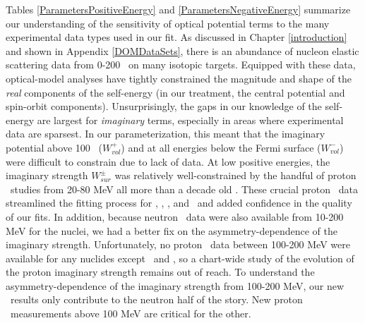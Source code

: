 Tables \ref{ParametersPositiveEnergy} and \ref{ParametersNegativeEnergy}
summarize our understanding of the
sensitivity of optical potential terms to the many experimental data types
used in our fit. As discussed in Chapter \ref{introduction} and shown in
Appendix \ref{DOMDataSets}, there is an abundance of nucleon elastic scattering data
from 0-200 \mega\electronvolt\ on many isotopic targets. Equipped with these data, optical-model 
analyses have tightly constrained the magnitude and shape of the \textit{real}
components of the self-energy (in our treatment, the central potential
and spin-orbit components). Unsurprisingly, the gaps in our knowledge of the self-energy are
largest for \textit{imaginary} terms, especially in areas where experimental
data are sparsest.
In our parameterization, this meant that the imaginary potential
above 100 \mega\electronvolt\ ($W_{vol}^{+}$) and at all
energies below the Fermi surface ($W_{vol}^{-}$) were difficult to constrain due
to lack of data. At low positive energies, the imaginary strength
$W_{sur}^{\pm}$ was relatively well-constrained by the handful of proton
\rxn\ studies from 20-80 MeV all more than a decade old \cite{Carlson75,
Slaus1975, Ingemarsson1999, Auce05}. These crucial proton \rxn\ data streamlined the fitting
process for \oSix, \caAughtEight, \niEight, and \pbEight\ and added confidence
in the quality of our fits. In addition, because neutron \tot\ data
were also available from 10-200 MeV for
the nuclei, we had a better fix on the asymmetry-dependence of the imaginary strength.
Unfortunately, no proton \rxn\ data between 100-200 MeV were available for any
nuclides except \caForty\ and \pbEight, so a chart-wide study of the evolution
of the proton imaginary strength remains out of reach. To understand the
asymmetry-dependence of the imaginary strength from 100-200 MeV, our new \tot\
results only contribute to the neutron half of the story. New proton \rxn\
measurements above 100 MeV are critical for the other.

